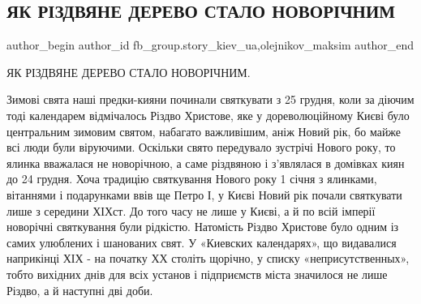  
 
 
 
 
 
\subsection{ЯК РІЗДВЯНЕ ДЕРЕВО СТАЛО НОВОРІЧНИМ}
\label{sec:30_12_2021.fb.fb_group.story_kiev_ua.1.rizdvo_derevo}
 
\ifcmt
 author_begin
   author_id fb_group.story_kiev_ua,olejnikov_maksim
 author_end
\fi

ЯК РІЗДВЯНЕ ДЕРЕВО СТАЛО НОВОРІЧНИМ.

Зимові свята наші предки-кияни починали святкувати з 25 грудня, коли за діючим
тоді календарем відмічалось Різдво Христове, яке у дореволюційному Києві було
центральним зимовим святом, набагато важливішим, аніж Новий рік, бо майже всі
люди були віруючими. Оскільки свято передувало зустрічі Нового року, то ялинка
вважалася не новорічною, а саме різдвяною і з’являлася в домівках киян до 24
грудня. Хоча традицію святкування Нового року 1 січня з ялинками, вітаннями і
подарунками ввів ще Петро І, у Києві Новий рік почали святкувати лише з
середини ХІХст. До того часу не лише у Києві, а й по всій імперії новорічні
святкування були рідкістю. Натомість Різдво Христове було одним із самих
улюблених і шанованих свят. У «Киевских календарях», що видавалися наприкінці
ХІХ - на початку ХХ століть щорічно, у списку «неприсутственных», тобто
вихідних днів для всіх установ і підприємств міста значилося не лише Різдво, а
й наступні дві доби. 

\begin{multicols}{2} %
\setlength{\parindent}{0pt}


\end{multicols} %


